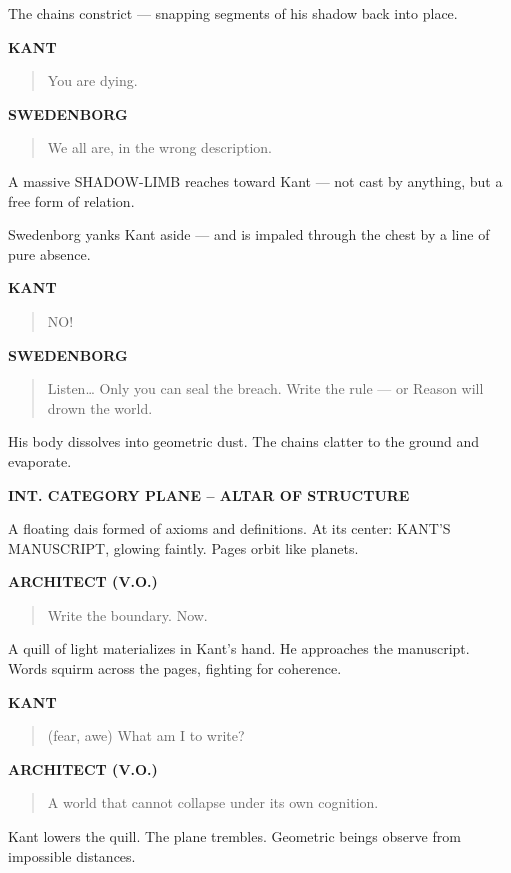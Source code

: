 \documentclass[12pt]{article}
\newcommand{\Scene}[1]{\vspace{1.2em}\textbf{#1}\vspace{0.8em}}
\newcommand{\Character}[1]{\vspace{0.8em}\textbf{#1}\vspace{0.4em}}
\newenvironment{Dialogue}{\begin{quote}\begin{RaggedRight}}{\end{RaggedRight}\end{quote}}
\newcommand{\Action}[1]{\vspace{0.4em}#1\vspace{0.4em}}
\begin{document}
\Action{The chains constrict — snapping segments of his shadow back into place.}

\Character{KANT}
\begin{Dialogue}
You are dying.
\end{Dialogue}

\Character{SWEDENBORG}
\begin{Dialogue}
We all are, in the wrong description.
\end{Dialogue}

\Action{A massive SHADOW-LIMB reaches toward Kant —  
not cast by anything, but a free form of relation.}

\Action{Swedenborg yanks Kant aside —  
and is impaled through the chest by a line of pure absence.}

\Character{KANT}
\begin{Dialogue}
NO!
\end{Dialogue}

\Character{SWEDENBORG}
\begin{Dialogue}
Listen…  
Only you can seal the breach.  
Write the rule —  
or Reason will drown the world.
\end{Dialogue}

\Action{His body dissolves into geometric dust.  
The chains clatter to the ground and evaporate.}

\Scene{INT. CATEGORY PLANE – ALTAR OF STRUCTURE}

\Action{A floating dais formed of axioms and definitions.  
At its center:  
KANT’S MANUSCRIPT, glowing faintly.  
Pages orbit like planets.}

\Character{ARCHITECT (V.O.)}
\begin{Dialogue}
Write the boundary.  
Now.
\end{Dialogue}

\Action{A quill of light materializes in Kant’s hand.  
He approaches the manuscript.  
Words squirm across the pages, fighting for coherence.}

\Character{KANT}
\begin{Dialogue}
(fear, awe)  
What am I to write?
\end{Dialogue}

\Character{ARCHITECT (V.O.)}
\begin{Dialogue}
A world that cannot collapse under its own cognition.
\end{Dialogue}

\Action{Kant lowers the quill.  
The plane trembles.  
Geometric beings observe from impossible distances.}
\end{document}
